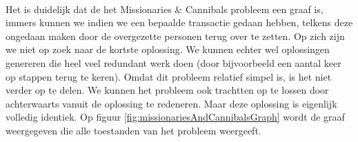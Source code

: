 \paragraph{}
\begin{leftbar}
Het is duidelijk dat de het Missionaries \& Cannibals probleem een graaf is, immers kunnen we indien we een bepaalde transactie gedaan hebben, telkens deze ongedaan maken door de overgezette personen terug over te zetten. Op zich zijn we niet op zoek naar de kortste oplossing. We kunnen echter wel oplossingen genereren die heel veel redundant werk doen (door bijvoorbeeld een aantal keer op stappen terug te keren). Omdat dit probleem relatief simpel is, is het niet verder op te delen. We kunnen het probleem ook trachtten op te lossen door achterwaarts vanuit de oplossing te redeneren. Maar deze oplossing is eigenlijk volledig identiek. Op figuur \ref{fig:missionariesAndCannibalsGraph} wordt de graaf weergegeven die alle toestanden van het probleem weergeeft.
\end{leftbar}
